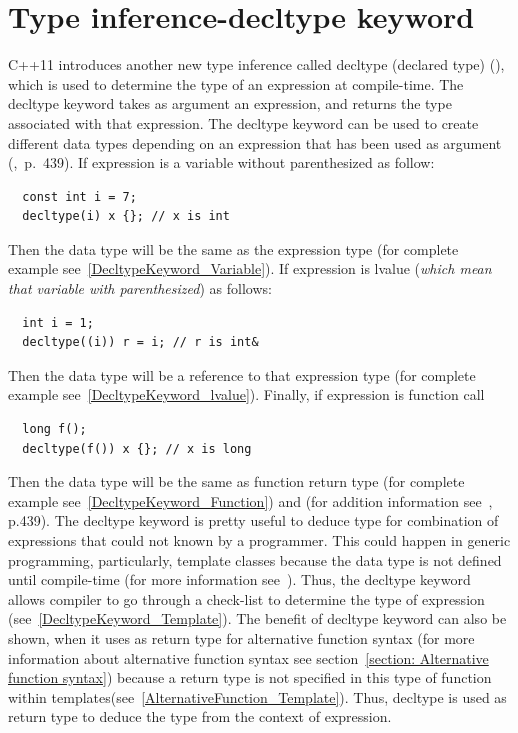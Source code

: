 \documentclass[11pt]{report}
\begin{document}
\section{Type inference-decltype keyword}
\label{section: Decltype keyword}
C++11 introduces another new type inference called decltype (declared type) (\cite{Stroustrup:2012:Cpp11}), which is used to determine the type of an expression at compile-time. The decltype keyword takes as argument an expression, and returns the type associated with that expression. The decltype keyword can be used to create different data types depending on an expression that has been used as argument (\cite{Prata:2012:Cpp},~p.~439). If expression is a variable without parenthesized as follow:
\begin{lstlisting}
  const int i = 7;
  decltype(i) x {}; // x is int
\end{lstlisting}
Then the data type will be the same as the expression type (for complete example see~\ref{DecltypeKeyword_Variable}). If expression is lvalue (\emph{which mean that variable with parenthesized}) as follows:
\begin{lstlisting}
  int i = 1;
  decltype((i)) r = i; // r is int&
\end{lstlisting}
Then the data type will be a reference to that expression type (for complete example see~\ref{DecltypeKeyword_lvalue}). Finally, if expression is function call 
\begin{lstlisting}
  long f();
  decltype(f()) x {}; // x is long
\end{lstlisting}
Then the data type will be the same as function return type (for complete example see~\ref{DecltypeKeyword_Function}) and (for addition information see~\cite{Prata:2012:Cpp}, p.439). The decltype keyword is pretty useful to deduce type for combination of expressions that could not known by a programmer. This could happen in generic programming, particularly, template classes because the data type is not defined until compile-time (for more information see~\cite{Stroustrup:2012:Cpp11}). Thus, the decltype keyword allows compiler to go through a check-list to determine the type of expression (see~\ref{DecltypeKeyword_Template}). The benefit of decltype keyword can also be shown, when it uses as return type for alternative function syntax (for more information about alternative function syntax see section~\ref{section: Alternative function syntax}) because a return type is not specified in this type of function within templates(see~\ref{AlternativeFunction_Template}). Thus, decltype is used as return type to deduce the type from the context of expression.
\end{document}
